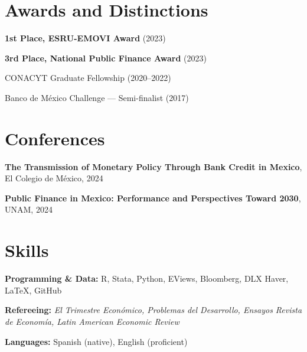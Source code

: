 \documentclass[11pt]{article}
\begin{document}

\section*{Awards and Distinctions}

\textbf{1st Place, ESRU-EMOVI Award} (2023)

\textbf{3rd Place, National Public Finance Award} (2023)

CONACYT Graduate Fellowship (2020–2022)

Banco de México Challenge — Semi-finalist (2017)


\section*{Conferences}

\textbf{The Transmission of Monetary Policy Through Bank Credit in Mexico}, El Colegio de México, 2024

\textbf{Public Finance in Mexico: Performance and Perspectives Toward 2030}, UNAM, 2024


\section*{Skills}

\textbf{Programming \& Data:} R, Stata, Python, EViews, Bloomberg, DLX Haver, \LaTeX, GitHub

\textbf{Refereeing:} \textit{El Trimestre Económico, Problemas del Desarrollo, Ensayos Revista de Economía, Latin American Economic Review}

\textbf{Languages:} Spanish (native), English (proficient)

\end{document}

